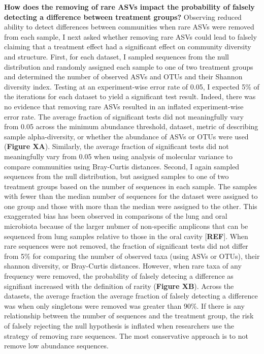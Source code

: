 \documentclass[]{article}
\begin{document}
\textbf{How does the removing of rare ASVs impact the probability of
falsely detecting a difference between treatment groups?} Observing
reduced ability to detect differences between communities when rare ASVs
were removed from each sample, I next asked whether removing rare ASVs
could lead to falsely claiming that a treatment effect had a significant
effect on community diversity and structure. First, for each dataset, I
sampled sequences from the null distribution and randomly assigned each
sample to one of two treatment groups and determined the number of
observed ASVs and OTUs and their Shannon diversity index. Testing at an
experiment-wise error rate of 0.05, I expected 5\% of the iterations for
each dataset to yield a significant test result. Indeed, there was no
evidence that removing rare ASVs resulted in an inflated experiment-wise
error rate. The average fraction of significant tests did not
meaningfully vary from 0.05 across the minimum abundance threshold,
dataset, metric of describing sample alpha-diversity, or whether the
abundance of ASVs or OTUs were used (\textbf{Figure XA}). Similarly, the
average fraction of significant tests did not meaningfully vary from
0.05 when using analysis of molecular variance to compare communities
using Bray-Curtis distances. Second, I again sampled sequences from the
null distribution, but assigned samples to one of two treatment groups
based on the number of sequences in each sample. The samples with fewer
than the median number of sequences for the dataset were assigned to one
group and those with more than the median were assigned to the other.
This exaggerated bias has been observed in comparisons of the lung and
oral microbiota because of the larger nubmer of non-specific amplicons
that can be sequenced from lung samples relative to those in the oral
cavity {[}\textbf{REF}{]}. When rare sequences were not removed, the
fraction of significant tests did not differ from 5\% for comparing the
number of observed taxa (using ASVs or OTUs), their shannon diversity,
or Bray-Curtis distances. However, when rare taxa of any frequency were
removed, the probability of falsely detecing a difference as signifiant
increased with the definition of rarity (\textbf{Figure XB}). Across the
datasets, the average fraction the average fraction of falsely detecting
a difference was when only singletons were removed was greater than
90\%. If there is any relationship between the number of sequences and
the treatment group, the risk of falsely rejecting the null hypothesis
is inflated when researchers use the strategy of removing rare
sequences. The most conservative approach is to not remove low abundance
sequences.
\end{document}
